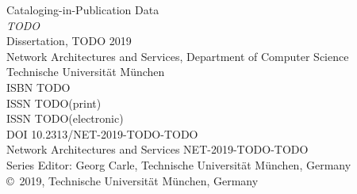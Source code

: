 \thispagestyle{empty}

\vspace*{1cm}
\vfill

\begin{flushleft}
\noindent
Cataloging-in-Publication Data\\
\emph{TODO}\\ %
Dissertation, TODO 2019\\
Network Architectures and Services, Department of Computer Science\\
Technische Universit\"at M\"unchen\\[1cm]
ISBN TODO\\
ISSN TODO(print)\\
ISSN TODO(electronic)\\
DOI 10.2313/NET-2019-TODO-TODO\\
Network Architectures and Services NET-2019-TODO-TODO\\
Series Editor: Georg Carle, Technische Universit\"at M\"unchen, Germany\\
\copyright\ 2019, Technische Universit\"at M\"unchen, Germany
\end{flushleft}

